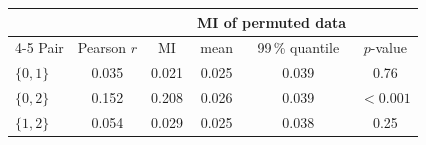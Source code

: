 \begin{tabular}{lccccc}
\toprule
 & & & \multicolumn{2}{c}{MI of permuted data} & \\
\cmidrule(lr){4-5}
Pair & Pearson $r$ & MI & mean & 99\,\% quantile & $p$-value \\
\midrule
$\{0,1\}$ & 0.035 & 0.021 & 0.025 & 0.039 & 0.76 \\
$\{0,2\}$ & 0.152 & 0.208 & 0.026 & 0.039 & $<0.001$ \\
$\{1,2\}$ & 0.054 & 0.029 & 0.025 & 0.038 & 0.25 \\
\bottomrule
\end{tabular}
